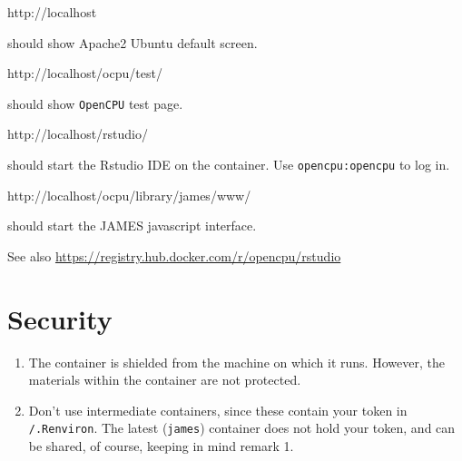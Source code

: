 \documentclass[]{book}
\newenvironment{Shaded}{\begin{snugshade}}{\end{snugshade}}
\newcommand{\ExtensionTok}[1]{#1}
\newcommand{\NormalTok}[1]{#1}
\providecommand{\tightlist}{%
  \setlength{\itemsep}{0pt}\setlength{\parskip}{0pt}}
\begin{document}
\begin{Shaded}
\begin{Highlighting}[]
\ExtensionTok{http}\NormalTok{://localhost}
\end{Highlighting}
\end{Shaded}

should show Apache2 Ubuntu default screen.

\begin{Shaded}
\begin{Highlighting}[]
\ExtensionTok{http}\NormalTok{://localhost/ocpu/test/}
\end{Highlighting}
\end{Shaded}

should show \texttt{OpenCPU} test page.

\begin{Shaded}
\begin{Highlighting}[]
\ExtensionTok{http}\NormalTok{://localhost/rstudio/}
\end{Highlighting}
\end{Shaded}

should start the Rstudio IDE on the container. Use \texttt{opencpu:opencpu} to log in.

\begin{Shaded}
\begin{Highlighting}[]
\ExtensionTok{http}\NormalTok{://localhost/ocpu/library/james/www/}
\end{Highlighting}
\end{Shaded}

should start the JAMES javascript interface.

See also \url{https://registry.hub.docker.com/r/opencpu/rstudio}

\hypertarget{security}{%
\section{Security}\label{security}}

\begin{enumerate}
\def\labelenumi{\arabic{enumi}.}
\tightlist
\item
  The container is shielded from the machine on which it runs. However, the materials within the container are not protected.
\item
  Don't use intermediate containers, since these contain your token in \texttt{/.Renviron}. The latest (\texttt{james}) container does not hold your token, and can be shared, of course, keeping in mind remark 1.
\end{enumerate}


\end{document}
